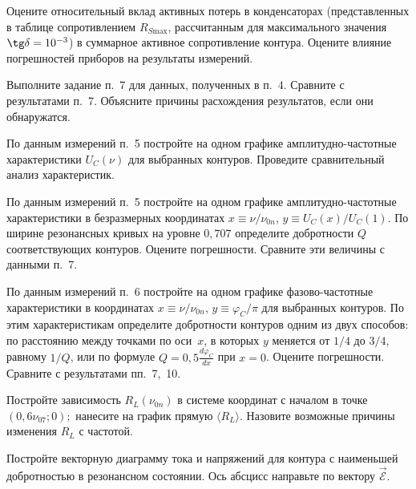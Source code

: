\begin{lab:task}
Оцените относительный вклад активных потерь в конденсаторах
(представленных в таблице сопротивлением $R_{S\text{max}}$, рассчитанным
для максимального значения $\tg\delta=10^{-3}$) в суммарное активное
сопротивление контура. Оцените влияние погрешностей приборов на результаты
измерений.

    \item *Выполните задание п.~7 для данных, полученных в п.~4. 
    Сравните с результатами п.~7. Объясните причины расхождения результатов, 
    если они обнаружатся.

    \item По данным измерений п.~5 постройте на одном графике
амплитудно-частотные характеристики $U_C(\nu)$ для выбранных
контуров. Проведите сравнительный анализ характеристик.

    \item По данным измерений п.~5 постройте на одном графике
амплитудно-частотные характеристики в безразмерных координатах 
$x\equiv \nu/\nu_{0n}$, $y\equiv U_C(x)/U_C(1)$. 
По ширине резонансных кривых на уровне $0,707$ определите добротности $Q$ 
соответствующих контуров. Оцените погрешности. 
Сравните эти величины с данными п.~7.

    \item По данным измерений п.~6 постройте на одном графике
фазово-частотные характеристики в координатах 
$x\equiv \nu/\nu_{0n}$, $y\equiv\varphi_C/\pi$ для выбранных контуров. 
По этим характеристикам определите
добротности контуров одним из двух способов: по расстоянию между точками по оси~$x$, 
в которых $y$ меняется от $1/4$ до $3/4$, равному $1/Q$, или по формуле
$Q=0,5\frac{d\varphi_C}{dx}$ при $x=0$. Оцените погрешности. 
Сравните с результатами пп.~7,~10.

    \item Постройте зависимость $R_L(\nu_{0n})$ в системе координат с началом 
    в точке $(0,6\nu_{07};0);$ нанесите на график прямую $\langle R_L\rangle$. 
    Назовите возможные причины изменения $R_L$ с частотой.

    \item Постройте векторную диаграмму тока и напряжений для контура 
    с наименьшей добротностью в резонансном состоянии. Ось абсцисс направьте 
    по вектору $\vec{\mathcal{E}}$.

\end{lab:task}


